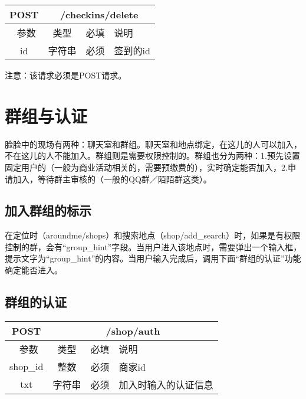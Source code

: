 \documentclass[cs4size]{ctexartutf8}
\begin{document}
\begin{table}[H]
   \begin{center}
\begin{tabular}{|c|c|c|p{12cm}|}
\hline
POST & \multicolumn{3}{|c|}{/checkins/delete} \\
\hline\hline
 \  参数  & 类型 & 必填 &  说明  \\
   \hline
 id  & 字符串 & 必须 & 签到的id\\ 
 \hline
\end{tabular}
   \end{center}
\end{table}

注意：该请求必须是POST请求。


\section{群组与认证}
脸脸中的现场有两种：聊天室和群组。聊天室和地点绑定，在这儿的人可以加入，不在这儿的人不能加入。群组则是需要权限控制的。群组也分为两种：1.预先设置固定用户的（一般为商业活动相关的，需要预缴费的），实时确定能否加入，2.申请加入，等待群主审核的（一般的QQ群／陌陌群这类）。

\subsection{加入群组的标示}
在定位时（aroundme/shops）和搜索地点（shop/add\_search）时，如果是有权限控制的群，会有“group\_hint”字段。当用户进入该地点时，需要弹出一个输入框，提示文字为“group\_hint”的内容。当用户输入完成后，调用下面“群组的认证”功能确定能否进入。


\subsection{群组的认证}
\begin{table}[H]
   \begin{center}
\begin{tabular}{|c|c|c|p{12cm}|}
\hline
POST & \multicolumn{3}{|c|}{/shop/auth} \\
\hline\hline
 \  参数  & 类型 & 必填 &  说明  \\
   \hline
 shop\_id  & 整数 & 必须 & 商家id\\ 
  \hline
 txt  & 字符串 & 必须 & 加入时输入的认证信息\\
 \hline
\end{tabular}
   \end{center}
\end{table}
\end{document}
